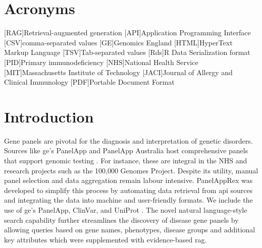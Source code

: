 \section*{Acronyms}
\renewenvironment{description} %
{\list{}{\labelwidth0pt\itemindent-\leftmargin
    \parsep-1em\itemsep0pt\let\makelabel\descriptionlabel}}
               {\endlist}
\begin{acronym} 
[RAG]{Retrieval-augmented generation}
[API]{Application Programming Interface}
[CSV]{comma-separated values}
[GE]{Genomics England}
[HTML]{HyperText Markup Language}
[TSV]{Tab-separated values}
[Rds]{R Data Serialization format}
[PID]{Primary immunodeficiency}
[NHS]{National Health Service}
[MIT]{Massachusetts Institute of Technology}
[JACI]{Journal of Allergy and Clinical Immunology}
[PDF]{Portable Document Format}

 \end{acronym} 
 
 
\section{Introduction}
\noindent
Gene panels are pivotal for the diagnosis and interpretation of genetic disorders. Sources like \ac{ge}’s PanelApp and PanelApp Australia host comprehensive panels that support genomic testing \cite{martin_panelapp_2019}. 
For instance, these are integral in the NHS and research projects such as the 100,000 Genomes Project\cite{martin_panelapp_2019}. Despite its utility, manual panel selection and data aggregation remain labour intensive. PanelAppRex was developed to simplify this process by automating data retrieval from \ac{api} sources and integrating the data into machine and user-friendly formats. We include the use of \ac{ge}’s PanelApp, ClinVar, and UniProt
\cite{martin_panelapp_2019,
landrum_clinvar_2018, the_uniprot_consortium_uniprot_2025}. 
The novel natural language-style search capability further streamlines the discovery of disease gene panels by allowing queries based on gene names, phenotypes, disease groups and additional key attributes which were supplemented with evidence-based \ac{rag}.


